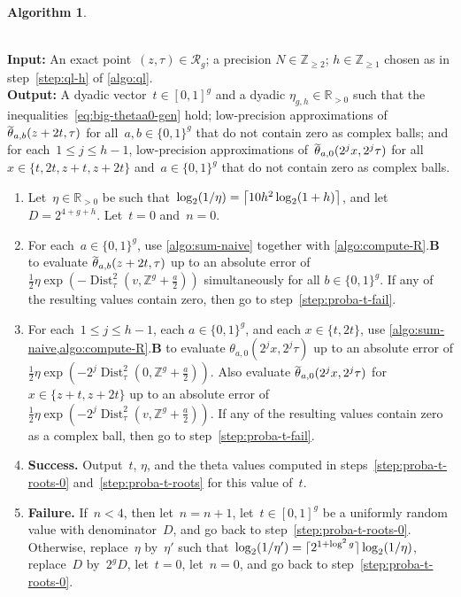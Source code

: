 \documentclass[12pt,oneside]{amsart}
\numberwithin{equation}{section}
\theoremstyle{definition}
\newtheorem{algorithm}[equation]{Algorithm}
\newcommand{\algoinput}[1]{~\\ \noindent\textbf{Input:} #1}
\newcommand{\algooutput}[1]{~\\ \noindent\textbf{Output:} #1}
\newcommand{\Z}{\mathbb{Z}}
\newcommand{\R}{\mathbb{R}}
\newcommand{\red}{\mathcal{R}}
\DeclareMathOperator{\Dist}{Dist}
\DeclareMathOperator{\thetatilde}{\rlap{\raisebox{-0.1ex}{$\widetilde{\phantom{\,t}}$}}\theta}
\DeclarePairedDelimiter{\ceil}{\lceil}{\rceil}
\begin{document}
\begin{algorithm}
  \label{algo:proba-t}

  \algoinput{An exact point~$(z,\tau)\in \red_g$; a
    precision $N\in \Z_{\geq 2}$; $h\in \Z_{\geq 1}$ chosen as in
    step~\eqref{step:ql-h} of \cref{algo:ql}.}  \algooutput{A dyadic
    vector~$t\in [0,1]^g$ and a dyadic $\eta_{g,h}\in \R_{>0}$ such that the
    inequalities~\eqref{eq:big-thetaa0-gen} hold; low-precision approximations
    of~$\thetatilde_{a,b}(z+2t,\tau)$ for all~$a,b\in \{0,1\}^g$ that do not
    contain zero as complex balls; and for each~$1\leq j\leq h-1$,
    low-precision approximations of~$\thetatilde_{a,0}(2^jx,2^j\tau)$ for all
    $x\in \{t, 2t, z+t, z+2t\}$ and~$a\in \{0,1\}^g$ that do not contain zero
    as complex balls.}

  \begin{enumerate}
  \item \label{step:proba-t-init} Let~$\eta\in \R_{>0}$ be such
    that~$\log_2(1/\eta) = \ceil[\big]{10 h^2\log_2(1+h)}$, and let
     $D=2^{4 + g + h}$. Let~$t=0$ and~$n=0$.
   \item \label{step:proba-t-roots-0} For each~$a\in \{0,1\}^g$, use
     \cref{algo:sum-naive} together with \cref{algo:compute-R}.\textbf{B} to
     evaluate $\thetatilde_{a,b}(z+2t,\tau)$ up to an absolute error of
     $\tfrac 12 \eta \exp(-\Dist_\tau^2(v,\Z^g + \tfrac a2))$ simultaneously
     for all $b\in \{0,1\}^g$. If any of the resulting values contain zero,
     then go to step~\eqref{step:proba-t-fail}.
   \item \label{step:proba-t-roots} For each~$1\leq j\leq h-1$, each
     $a\in \{0,1\}^g$, and each $x\in \{t,2t\}$, use
     \cref{algo:sum-naive,algo:compute-R}.\textbf{B} to evaluate
     $\theta_{a,0}(2^jx, 2^j\tau)$ up to an absolute error of
     $\tfrac 12 \eta\exp(-2^j\Dist_\tau^2(0,\Z^g + \tfrac a2))$. Also evaluate
     $\thetatilde_{a,0}(2^jx, 2^j\tau)$ for~$x\in\{z+t,z+2t\}$ up to an
     absolute error of
     $\tfrac 12\eta\exp(-2^j\Dist_\tau^2(v, \Z^g + \tfrac a2))$. If any of the
     resulting values contain zero as a complex ball, then go to
     step~\eqref{step:proba-t-fail}.
  \item \label{step:proba-t-output} \textbf{Success.} Output~$t$, $\eta$, and the
    theta values computed in steps~\eqref{step:proba-t-roots-0}
    and~\eqref{step:proba-t-roots} for this value of~$t$.
  \item \label{step:proba-t-fail} \textbf{Failure.} If~$n < 4$, then
    let~$n = n+1$, let~$t\in [0,1]^g$ be a uniformly random value with
    denominator~$D$, and go back to
    step~\eqref{step:proba-t-roots-0}. Otherwise, replace~$\eta$ by~$\eta'$
    such that~$\log_2(1/\eta') = \ceil{2^{1+\log^2 g}}\log_2(1/\eta)$, replace~$D$
    by~$2^g D$, let~$t=0$, let~$n=0$, and go back to
    step~\eqref{step:proba-t-roots-0}.
  \end{enumerate}
\end{algorithm}
\end{document}
